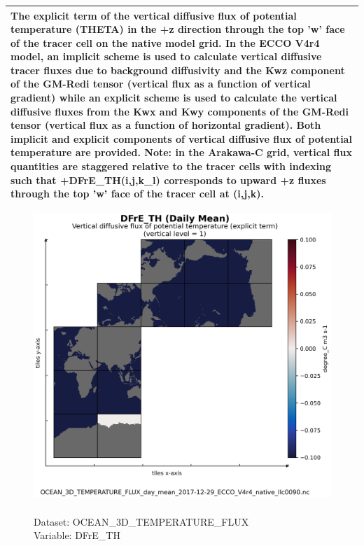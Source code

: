 \begin{longtable}{|p{}|p{}|p{}|p{}|}
\multicolumn{4}{|p{1\textwidth}|}{The explicit term of the vertical diffusive flux of potential temperature (THETA) in the +z direction through the top 'w' face of the tracer cell on the native model grid. In the ECCO V4r4 model, an implicit scheme is used to calculate vertical diffusive tracer fluxes due to background diffusivity and the Kwz component of the GM-Redi tensor (vertical flux as a function of vertical gradient) while an explicit scheme is used to calculate the vertical diffusive fluxes from the Kwx and Kwy components of the GM-Redi tensor (vertical flux as a function of horizontal gradient). Both implicit and explicit components of vertical diffusive flux of potential temperature are provided. Note: in the Arakawa-C grid, vertical flux quantities are staggered relative to the tracer cells with indexing such that +DFrE\_TH(i,j,k\_l) corresponds to upward +z fluxes through the top 'w' face of the tracer cell at (i,j,k).} \\ \hline
\end{longtable}

\begin{figure}[H]
\centering
\includegraphics[scale=0.5]{../images/plots/native_plots/Ocean_Three-Dimensional_Potential_Temperature_Fluxes/DFrE_TH.png}
\caption{\\Dataset: OCEAN\_3D\_TEMPERATURE\_FLUX\\Variable: DFrE\_TH}
\label{tab:table-OCEAN_3D_TEMPERATURE_FLUX_DFrE_TH-Plot}
\end{figure}
\pagebreak
